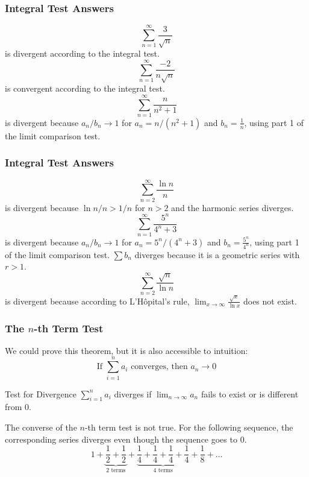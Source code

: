\documentclass[xcolor=dvipsnames]{beamer}
\begin{document}
\begin{frame}
  \frametitle{Integral Test Answers}
  \begin{equation}
    \label{eq:voomeijo}
\sum_{n=1}^{\infty}\frac{3}{\sqrt{n}}    
\end{equation}
is divergent according to the integral test.
\begin{equation}
  \label{eq:oageevae}
\sum_{n=1}^{\infty}\frac{-2}{n\sqrt{n}}  
\end{equation}
is convergent according to the integral test.
\begin{equation}
  \label{eq:phoewahg}
  \sum_{n=1}^{\infty}\frac{n}{n^{2}+1}
\end{equation}
is divergent because $a_{n}/b_{n}\longrightarrow{}1$ for
$a_{n}=n/(n^{2}+1)$ and $b_{n}=\frac{1}{n}$, using part 1 of the limit
comparison test.
\end{frame}

\begin{frame}
  \frametitle{Integral Test Answers}
  \begin{equation}
    \label{eq:ziegaequ}
    \sum_{n=2}^{\infty}\frac{\ln{}n}{n}
  \end{equation}
  is divergent because $\ln{}n/n>1/n$ for $n>2$ and the harmonic
  series diverges.
  \begin{equation}
    \label{eq:ezahraox}
    \sum_{n=1}^{\infty}\frac{5^{n}}{4^{n}+3}
  \end{equation}
is divergent because $a_{n}/b_{n}\longrightarrow{}1$ for
$a_{n}=5^{n}/(4^{n}+3)$ and $b_{n}=\frac{5^{n}}{4^{n}}$, using part 1 of the limit
comparison test. $\sum{}b_{n}$ diverges because it is a geometric
series with $r>1$.
\begin{equation}
  \label{eq:queiquai}
  \sum_{n=2}^{\infty}\frac{\sqrt{n}}{\ln{}n}
\end{equation}
is divergent because according to L'H{\^o}pital's rule,
$\lim_{x\rightarrow{}\infty}\frac{\sqrt{x}}{\ln{}x}$ does not exist.
\end{frame}

\begin{frame}
  \frametitle{The $n$-th Term Test}
  We could prove this theorem, but it is also accessible to intuition:
  \begin{equation}
    \label{eq:taingaik}
    \mbox{If }\sum_{i=1}^{n}a_{i}\mbox{ converges, then }a_{n}\longrightarrow{}0
  \end{equation}
  \begin{block}{Test for Divergence}
    $\sum_{i=1}^{n}a_{i}$ diverges if $\lim_{n\rightarrow\infty}a_{n}$
    fails to exist or is different from $0$.
  \end{block}
  The converse of the $n$-th term test is not true. For the following
  sequence, the corresponding series diverges even though the sequence
  goes to $0$.
  \begin{equation}
    \label{eq:aephieng}
    1+\underbrace{\frac{1}{2}+\frac{1}{2}}_\text{2 terms}+\underbrace{\frac{1}{4}+\frac{1}{4}+\frac{1}{4}+\frac{1}{4}}_\text{4 terms}+\frac{1}{8}+{\ldots}
  \end{equation}
\end{frame}
\end{document}
